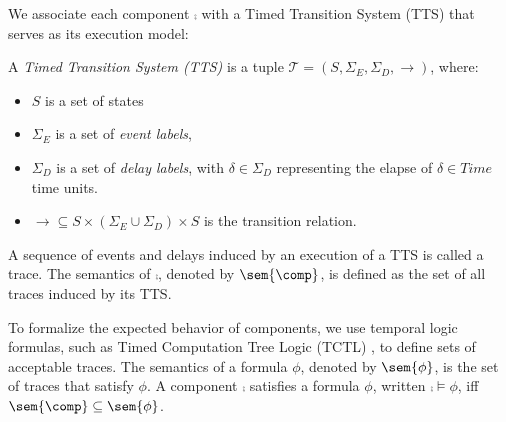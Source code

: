 We associate each component $\comp$ with a Timed Transition System (TTS)
that serves as its execution model:



\begin{definition}\label{def:tts}
A \emph{Timed Transition System (TTS)} is a tuple
$\mathcal{T} = (S, \Sigma_E, \Sigma_D, \rightarrow)$, where:
\begin{itemize}
    \item $S$ is a set of states%
    \item $\Sigma_E$ is a set of \emph{event labels},
    \item $\Sigma_D$ is a set of \emph{delay labels}, with $\delta \in \Sigma_D$ representing the elapse of $\delta \in Time$ time units. 
    
    
    \item $\rightarrow \subseteq S \times (\Sigma_E \cup \Sigma_D) \times S$
    is the transition relation.
\end{itemize}
\end{definition}
A sequence of events and delays induced by an execution of a TTS is called a trace. The semantics of $\comp$, denoted by $\sem{\comp}$, is defined as the set of all traces induced by its TTS. %




To formalize the expected behavior of components, we use temporal logic formulas, such as Timed Computation Tree Logic (TCTL) \cite{AD94}, to define sets of acceptable traces. The semantics of a formula $\phi$, denoted by $\sem{\phi}$, is the set of traces that satisfy $\phi$. A component $\comp$ satisfies a formula $\phi$, written $\comp \models \phi$, iff $\sem{\comp} \subseteq \sem{\phi}$. 

